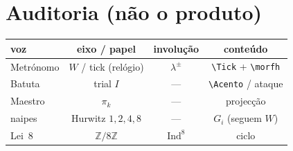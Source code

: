 \documentclass[11pt,a4paper]{article}
\newcommand{\Tick}{$\bullet$}
\newcommand{\Acento}{$>$\,}
\begin{document}
\pipagina{40mm}%
\section{Auditoria (não o produto)}

\begin{center}\small
\begin{tabular}{@{}lccc@{}}
voz & eixo / papel & involução & conteúdo \\
\hline
Metrónomo & $W$ / tick (relógio) & $\lambda^{\pm}$ & \verb|\Tick| + \verb|\morfh| \\
Batuta & trial $I$ & --- & \verb|\Acento| / ataque \\
Maestro & $\pi_k$ & --- & projecção \\
naipes & Hurwitz $1,2,4,8$ & --- & $G_i$ (seguem $W$) \\
Lei~8 & $\mathbb{Z}/8\mathbb{Z}$ & $\operatorname{Ind}^{8}$ & ciclo \\
\end{tabular}
\end{center}
\end{document}
